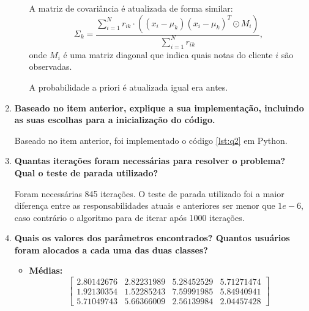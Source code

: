 \begin{enumerate}
\begin{tcolorbox}[title=Resposta (continuação):]
\begin{itemize}
        A matriz de covariância é atualizada de forma similar:
        \begin{equation}
            \Sigma_k = \frac{\sum_{i=1}^N r_{ik} \cdot \left((x_i - \mu_k)(x_i - \mu_k)^T \odot M_i \right)}{\sum_{i=1}^N r_{ik}},
        \end{equation}
        onde $M_i$ é uma matriz diagonal que indica quais notas do cliente $i$ são observadas.

        A probabilidade a priori é atualizada igual era antes.

    \end{itemize}

    \end{tcolorbox}

    \item \textbf{Baseado no item anterior, explique a sua implementação, incluindo as suas escolhas para a inicialização do código.}
    \begin{tcolorbox}[title=Resposta:]
        Baseado no item anterior, foi implementado o código \ref{lst:q2} em Python.
    \end{tcolorbox}
    
    \item \textbf{Quantas iterações foram necessárias para resolver o problema? Qual o teste de parada utilizado?}
    \begin{tcolorbox}[title=Resposta:]
        Foram necessárias 845 iterações. O teste de parada utilizado foi a maior diferença entre as responsabilidades atuais e anteriores ser menor que $1e-6$, caso contrário o algoritmo para de iterar após 1000 iterações.
    \end{tcolorbox}
    \item \textbf{Quais os valores dos parâmetros encontrados? Quantos usuários foram alocados a cada uma das duas classes?}
    \begin{tcolorbox}[title=Resposta:]
        \begin{itemize}
            \item \textbf{Médias:}
            \[
            \begin{bmatrix}
            2.80142676 & 2.82231989 & 5.28452529 & 5.71271474 \\
            1.92130354 & 1.52285243 & 7.59991985 & 5.84940941 \\
            5.71049743 & 5.66366009 & 2.56139984 & 2.04457428
            \end{bmatrix}
            \]
        

\end{itemize}
\end{tcolorbox}
\end{enumerate}

